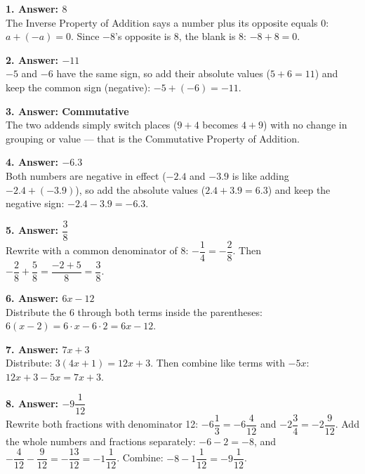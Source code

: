 \documentclass[11pt]{article}
\newcommand{\subhead}[1]{\vspace{6pt}\noindent{\bfseries\color{navy}#1}\par\vspace{4pt}}
\begin{document}
\subhead{Part 3 --- Fill in the Blank}

\noindent\textbf{1. Answer: $8$}\\
\hspace*{1em}The Inverse Property of Addition says a number plus its opposite equals 0: $a + (-a) = 0$. Since $-8$'s opposite is $8$, the blank is $8$: $-8 + 8 = 0$.

\vspace{6pt}\noindent\textbf{2. Answer: $-11$}\\
\hspace*{1em}$-5$ and $-6$ have the same sign, so add their absolute values ($5+6=11$) and keep the common sign (negative): $-5+(-6)=-11$.

\vspace{6pt}\noindent\textbf{3. Answer: Commutative}\\
\hspace*{1em}The two addends simply switch places ($9+4$ becomes $4+9$) with no change in grouping or value --- that is the Commutative Property of Addition.

\vspace{6pt}\noindent\textbf{4. Answer: $-6.3$}\\
\hspace*{1em}Both numbers are negative in effect ($-2.4$ and $-3.9$ is like adding $-2.4+(-3.9)$), so add the absolute values ($2.4+3.9=6.3$) and keep the negative sign: $-2.4-3.9=-6.3$.

\vspace{6pt}\noindent\textbf{5. Answer: $\dfrac{3}{8}$}\\
\hspace*{1em}Rewrite with a common denominator of 8: $-\dfrac{1}{4}=-\dfrac{2}{8}$. Then $-\dfrac{2}{8}+\dfrac{5}{8}=\dfrac{-2+5}{8}=\dfrac{3}{8}$.

\vspace{6pt}\noindent\textbf{6. Answer: $6x-12$}\\
\hspace*{1em}Distribute the 6 through both terms inside the parentheses: $6(x-2)=6\cdot x - 6\cdot 2 = 6x-12$.

\vspace{6pt}\noindent\textbf{7. Answer: $7x+3$}\\
\hspace*{1em}Distribute: $3(4x+1)=12x+3$. Then combine like terms with $-5x$: $12x+3-5x=7x+3$.

\vspace{6pt}\noindent\textbf{8. Answer: $-9\dfrac{1}{12}$}\\
\hspace*{1em}Rewrite both fractions with denominator 12: $-6\dfrac{1}{3}=-6\dfrac{4}{12}$ and $-2\dfrac{3}{4}=-2\dfrac{9}{12}$. Add the whole numbers and fractions separately: $-6-2=-8$, and $-\dfrac{4}{12}-\dfrac{9}{12}=-\dfrac{13}{12}=-1\dfrac{1}{12}$. Combine: $-8-1\dfrac{1}{12}=-9\dfrac{1}{12}$.
\end{document}
